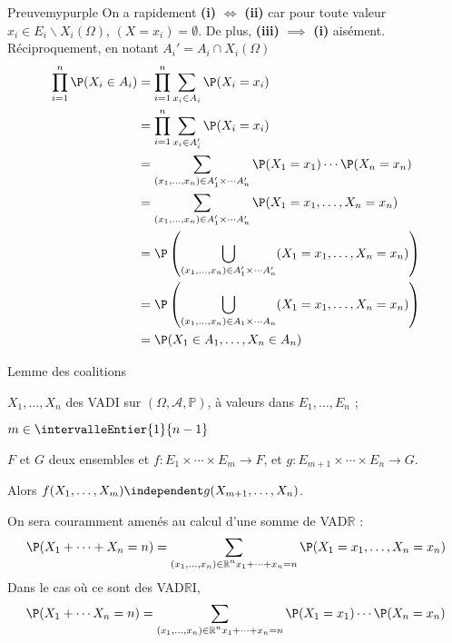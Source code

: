     \begin{demo}{Preuve}{mypurple}
        On a rapidement \textbf{(i)} $\iff$ \textbf{(ii)} car pour toute valeur $x_i \in E_i \backslash X_i(\Omega)$, $(X = x_i) = \emptyset$. De plus, \textbf{(iii)} $\implies$ \textbf{(i)} aisément. Réciproquement, en notant $A_i' = A_i \cap X_i(\Omega)$
        \begin{align*}
            \prod_{i = 1}^n \P(X_i \in A_i) &= \prod_{i = 1}^n \sum_{x_i \in A_i} \P(X_i = x_i) \\
            &= \prod_{i = 1}^n \sum_{x_i \in A_i'} \P(X_i = x_i) \\
            &= \sum_{(x_1,\ldots,x_n) \in A_1'\times \cdots A_n'} \P(X_1 = x_1) \cdots \P(X_n = x_n) \\
            &= \sum_{(x_1,\ldots,x_n) \in A_1'\times \cdots A_n'} \P(X_1 = x_1, \ldots, X_n = x_n) \\
            &= \P\left(\bigcup_{(x_1,\ldots,x_n) \in A_1'\times \cdots A_n'} (X_1 = x_1, \ldots, X_n = x_n)\right) \\
            &= \P\left(\bigcup_{(x_1,\ldots,x_n) \in A_1\times \cdots A_n} (X_1 = x_1, \ldots, X_n = x_n)\right) \\
            &= \P(X_1 \in A_1, \ldots, X_n \in A_n)
        \end{align*}
    \end{demo}

    \begin{theo}{Lemme des coalitions}{}
        \begin{soit}
            \item $X_1,\ldots,X_n$ des VADI sur $\left(\Omega, \mathcal{A}, \mathbb{P}\right)$, à valeurs dans $E_1, \ldots, E_n$ ;
            \item $m \in \intervalleEntier{1}{n-1}$
            \item $F$ et $G$ deux ensembles et $f : E_1 \times \cdots \times E_m \to F$, et $g : E_{m+1} \times \cdots \times E_n \to G$. 
        \end{soit}
        Alors $f(X_1,\ldots,X_m) \independent g(X_{m+1}, \ldots, X_n)$. 
    \end{theo}

    On sera couramment amenés au calcul d’une somme de VAD$\mathbb{R}$ : 
    \[ \P(X_1 + \cdots + X_n = n) = \sum_{\substack{(x_1,\ldots,x_n) \in \mathbb{R}^n} \\ x_1 + \cdots + x_n = n} \P(X_1= x_1,\ldots,X_n = x_n) \]    
    Dans le cas où ce sont des VAD$\mathbb{R}$I, 
    \[ \P(X_1 + \cdots X_n = n) = \sum_{\substack{(x_1,\ldots,x_n) \in \mathbb{R}^n} \\ x_1 + \cdots + x_n = n} \P(X_1= x_1)\cdots \P(X_n = x_n) \]   

